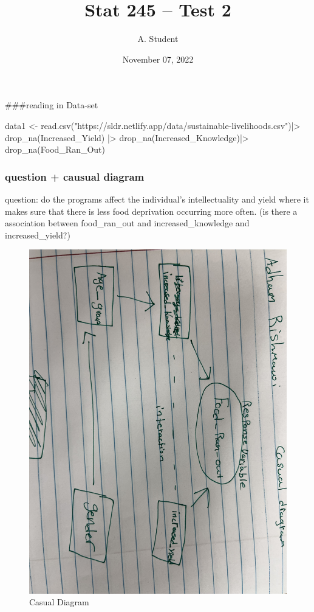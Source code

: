 \documentclass[
]{article}
\title{Stat 245 -- Test 2}
\author{A. Student}
\date{November 07, 2022}
\newenvironment{Shaded}{\begin{snugshade}}{\end{snugshade}}
\newcommand{\FunctionTok}[1]{\textcolor[rgb]{0.00,0.00,0.00}{#1}}
\newcommand{\NormalTok}[1]{#1}
\newcommand{\OtherTok}[1]{\textcolor[rgb]{0.56,0.35,0.01}{#1}}
\newcommand{\SpecialCharTok}[1]{\textcolor[rgb]{0.00,0.00,0.00}{#1}}
\newcommand{\StringTok}[1]{\textcolor[rgb]{0.31,0.60,0.02}{#1}}
\begin{document}
\maketitle

\#\#\#reading in Data-set

\begin{Shaded}
\begin{Highlighting}[]
\NormalTok{data1 }\OtherTok{\textless{}{-}} \FunctionTok{read.csv}\NormalTok{(}\StringTok{"https://sldr.netlify.app/data/sustainable{-}livelihoods.csv"}\NormalTok{)}\SpecialCharTok{|\textgreater{}}
  \FunctionTok{drop\_na}\NormalTok{(Increased\_Yield) }\SpecialCharTok{|\textgreater{}}
  \FunctionTok{drop\_na}\NormalTok{(Increased\_Knowledge)}\SpecialCharTok{|\textgreater{}}
  \FunctionTok{drop\_na}\NormalTok{(Food\_Ran\_Out)}
\end{Highlighting}
\end{Shaded}

\hypertarget{question-causual-diagram}{%
\subsubsection{question + causual
diagram}\label{question-causual-diagram}}

question: do the programs affect the individual's intellectuality and
yield where it makes sure that there is less food deprivation occurring
more often. (is there a association between food\_ran\_out and
increased\_knowledge and increased\_yield?)

\begin{figure}
\centering
\includegraphics{cas_diag.jpg}
\caption{Casual Diagram}
\end{figure}
\end{document}

